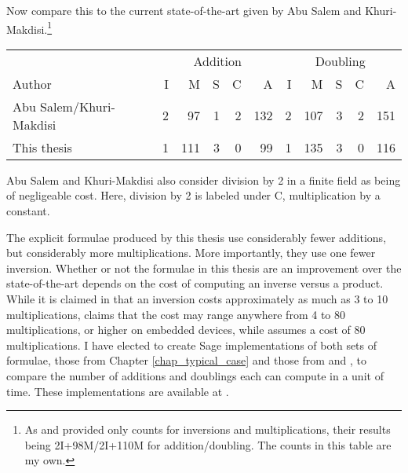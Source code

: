 Now compare this to the current state-of-the-art given by
Abu Salem and Khuri-Makdisi.\footnote{
As \cite{kmakdisi18} and \cite{salem07} provided only counts for inversions and multiplications,
their results being 2I+98M/2I+110M for addition/doubling. The counts in this table are my own.}
\begin{center}
\begin{tabular}{|l|rrrrr|rrrrr|}
  \hline
  & \multicolumn{5}{c|}{Addition} & \multicolumn{5}{c|}{Doubling} \\
  Author                  & I &  M & S & C &   A & I &   M & S & C & A \\
  \hline
  Abu Salem/Khuri-Makdisi \cite{kmakdisi18,salem07}
                          & 2 & 97 &  1 & 2 & 132 & 2 & 107 &  3 & 2 & 151 \\
  This thesis             & 1 & 111 & 3 & 0 &  99 & 1 & 135 &  3 & 0 & 116 \\
  \hline
\end{tabular}
\end{center}
Abu Salem and Khuri-Makdisi also consider division by 2 in a finite field as being of negligeable cost.
Here, division by 2 is labeled under C, multiplication by a constant.

The explicit formulae produced by this thesis use considerably fewer additions, but considerably more multiplications.
More importantly, they use one fewer inversion.
Whether or not the formulae in this thesis are an improvement over the state-of-the-art depends
on the cost of computing an inverse versus a product.
While it is claimed in \cite{salem07} that an inversion costs approximately as much as 3 to 10 multiplications,
\cite{dahmen07} claims that the cost may range anywhere from 4 to 80 multiplications, or higher on embedded devices,
while \cite{hankerson04} assumes a cost of 80 multiplications.
I have elected to create Sage implementations of both sets of formulae,
those from Chapter \ref{chap_typical_case} and those from \cite{salem07} and \cite{kmakdisi18},
to compare the number of additions and doublings each can compute in a unit of time.
These implementations are available at \cite{github}.

